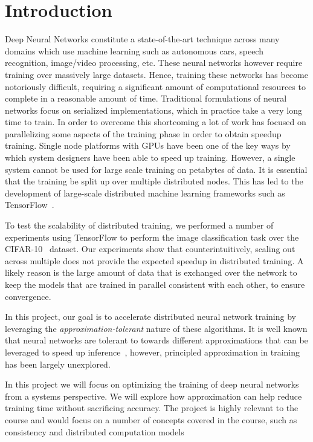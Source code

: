\section{Introduction}
Deep Neural Networks constitute a state-of-the-art technique across many domains which use machine learning such as autonomous cars, speech recognition, image/video processing, etc. These neural networks however require training over massively large datasets. Hence, training these networks has become notoriously difficult, requiring a significant amount of computational resources to complete in a reasonable amount of time. Traditional formulations of neural networks focus on serialized implementations, which in practice take a very long time to train. In order to overcome this shortcoming a lot of work has focused on parallelizing some aspects of the training phase in order to obtain speedup training. Single node platforms with GPUs have been one of the key ways by which system designers have been able to speed up training. However, a single system cannot be used for large scale training on petabytes of data. It is essential that the training be split up over multiple distributed nodes. This has led to the development of large-scale distributed machine learning frameworks such as TensorFlow~\cite{tensorflow}. 

To test the scalability of distributed training, we performed a number of experiments using TensorFlow to perform the image classification task over the CIFAR-10~\cite{cifar10} dataset. Our experiments show that counterintuitively, scaling out across multiple does not provide the expected speedup in distributed training. A likely reason is the large amount of data that is exchanged over the network to keep the models that are trained in parallel consistent with each other, to ensure convergence. 

In this project, our goal is to accelerate distributed neural network training by leveraging the \emph{approximation-tolerant} nature of these algorithms. It is well known that neural networks are tolerant to towards different approximations that can be leveraged to speed up inference~\cite{x,y}, however, principled approximation in training has been largely unexplored. 

In this project we will focus on optimizing the training of deep neural networks from a systems perspective.
We will explore how approximation can help reduce training time without sacrificing accuracy. The project
is highly relevant to the course and would focus on a number of concepts covered in the course, such as
consistency and distributed computation models

